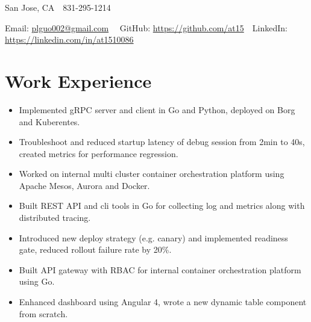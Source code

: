 \documentclass[11pt, letterpaper]{simple-cv}
\begin{document}
\centerline{
	San Jose, CA\ \
	831-295-1214\ \
}
\centerline{
	Email: \href{plguo002@gmail.com}{plguo002@gmail.com}\ \
	GitHub: \href{https://github.com/at15}{https://github.com/at15}\ \
	LinkedIn: \href{https://www.linkedin.com/in/at1510086}{https://linkedin.com/in/at1510086}}

\section{Work Experience}

\begin{itemize}
	\item Implemented gRPC server and client in Go and Python, deployed on Borg and Kuberentes.
	\item Troubleshoot and reduced startup latency of debug session from 2min to 40s, created metrics for performance regression.
\end{itemize}

\begin{itemize}
	\item Worked on internal multi cluster container orchestration platform using Apache Mesos, Aurora and Docker.
	\item Built REST API and cli tools in Go for collecting log and metrics along with distributed tracing.
	\item Introduced new deploy strategy (e.g. canary) and implemented readiness gate, reduced rollout failure rate by 20\%.
\end{itemize}

\begin{itemize}
	\item Built API gateway with RBAC for internal container orchestration platform using Go.
	\item Enhanced dashboard using Angular 4, wrote a new dynamic table component from scratch.
\end{itemize}
\end{document}
